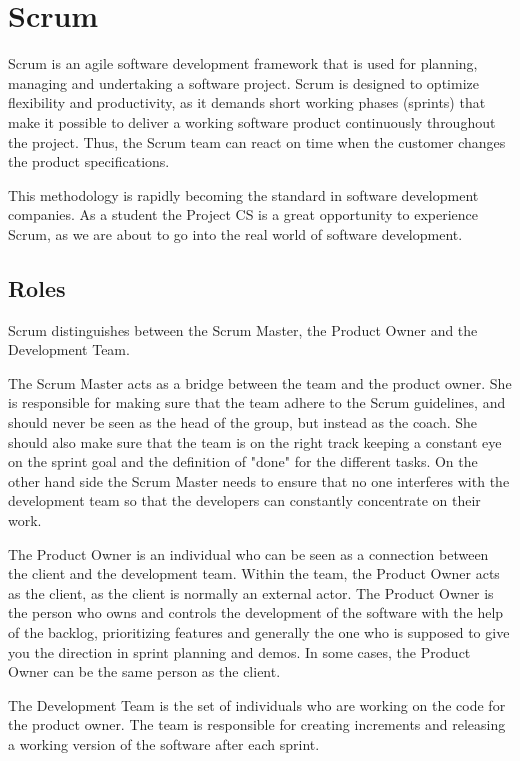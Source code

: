\section{Scrum}
Scrum is an agile software development framework that is used for planning, managing
and undertaking a software project. Scrum is designed to optimize flexibility and productivity,
as it demands short working phases (sprints) that make it possible to deliver
a working software product continuously throughout the project. Thus, the Scrum team
can react on time when the customer changes the product specifications.

This methodology is rapidly becoming the standard
in software development companies. As a student the Project CS is a great opportunity
to experience Scrum, as we are about to go into the real world of software development.

\subsection{Roles}

Scrum distinguishes between the Scrum Master, the Product Owner and the Development Team.

The Scrum Master acts as a bridge between the team and the product owner. 
She is responsible for making sure that the team adhere to the Scrum guidelines,
and should never be seen as the head of the group, but instead as the coach.
She should also make sure that the team is on the right track keeping a constant eye on the sprint goal
and the definition of "done" for the different tasks. On the other hand side the Scrum Master
needs to ensure that no one interferes with the development team so that the developers
can constantly concentrate on their work.

The Product Owner is an individual who can be seen as a connection between the client and
the development team. Within the team, the Product Owner acts as the client, as the client
is normally an external actor.
The Product Owner is the person who owns and controls the development of the software with the help of the backlog,
prioritizing features and generally the one who is supposed to give you the direction in sprint planning and demos.
In some cases, the Product Owner can be the same person as the client.

The Development Team is the set of individuals who are working on the code for the product owner.
The team is responsible for creating increments and releasing a working version of the software
after each sprint.



